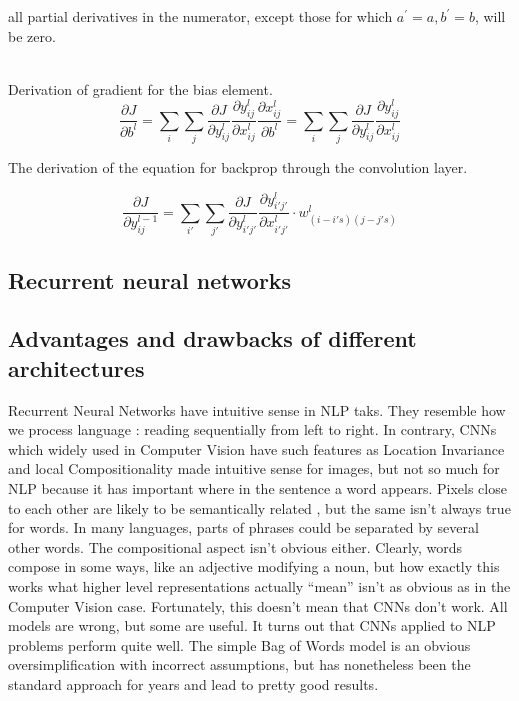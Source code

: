 all partial derivatives in the numerator, except those for which $a^{'}= a, b^{'} = b$, will be zero. 

~\\
Derivation of gradient for the bias element. 
\begin{equation}
 \dfrac{\partial J}{\partial b^l} = \sum_{i}\sum_{j} \dfrac{\partial J}{\partial y^l_{ij}}\dfrac{\partial y^l_{ij}}{\partial x^l_{ij}}\dfrac{\partial x^l_{ij}}{\partial b^l} = \sum_{i}\sum_{j} \dfrac{\partial J}{\partial y^l_{ij}}\dfrac{\partial y^l_{ij}}{\partial x^l_{ij}} 
\end{equation}

\noindent The derivation of the equation for backprop through the convolution layer.

\begin{equation}
\frac{\partial J}{\partial y^{l-1}_{ij}}= \sum_{i'}\sum_{j'} \frac{\partial J}{\partial y^l_{i'j'}}\frac{\partial y^l_{i'j'}}{\partial x^l_{i'j'}} \cdot w^{l}_{(i-i's)(j-j's)}
\end{equation}

\subsection{Recurrent neural networks} 

\subsection{Advantages and drawbacks of different architectures} 

Recurrent Neural Networks have intuitive sense in NLP taks. They resemble how we process language : reading sequentially from left to right. 
In contrary, CNNs which widely used in Computer Vision have such features as Location Invariance and local Compositionality made intuitive sense for images, but not so much for NLP because it has important where in the sentence a word appears. Pixels close to each other are likely to be semantically related , but the same isn’t always true for words.  In many languages, parts of phrases could be separated by several other words. The compositional aspect isn’t obvious either. Clearly, words compose in some ways, like an adjective modifying a noun, but how exactly this works what higher level representations actually “mean” isn’t as obvious as in the Computer Vision case. Fortunately, this doesn’t mean that CNNs don’t work.  All models are wrong, but some are useful. It turns out that CNNs applied to NLP problems perform quite well. The simple Bag of Words model is an obvious oversimplification with incorrect assumptions, but has nonetheless been the standard approach for years and lead to pretty good results.

